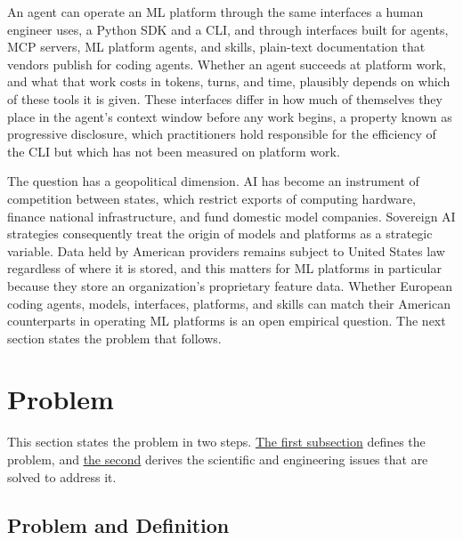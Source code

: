 \documentclass[
english,                 %
bibtex,                  %
]{kththesis}
\numberwithin{listing}{chapter}
\begin{document}
An agent can operate an \gls{ML} platform through the same interfaces a human engineer uses, a Python \gls{SDK} and a \gls{CLI}, and through interfaces built for agents, \gls{MCP} servers, \gls{ML} platform agents, and skills, plain-text documentation that vendors publish for coding agents. Whether an agent succeeds at platform work, and what that work costs in tokens, turns, and time, plausibly depends on which of these tools it is given. These interfaces differ in how much of themselves they place in the agent's context window before any work begins, a property known as progressive disclosure, which practitioners hold responsible for the efficiency of the \gls{CLI} but which has not been measured on platform work.

The question has a geopolitical dimension. \Gls{AI} has become an instrument of competition between states, which restrict exports of computing hardware, finance national infrastructure, and fund domestic model companies. Sovereign \gls{AI} strategies consequently treat the origin of models and platforms as a strategic variable. Data held by American providers remains subject to United States law regardless of where it is stored, and this matters for \gls{ML} platforms in particular because they store an organization's proprietary feature data. Whether European coding agents, models, interfaces, platforms, and skills can match their American counterparts in operating \gls{ML} platforms is an open empirical question. The next section states the problem that follows.

\section{Problem}
\label{sec:intro_problem}
\glsresetall

This section states the problem in two steps. \hyperref[sec:intro_problem_and_definition]{The first subsection} defines the problem, and \hyperref[sec:intro_scientific_and_engineering_issues]{the second} derives the scientific and engineering issues that are solved to address it.

\subsection{Problem and Definition}
\label{sec:intro_problem_and_definition}
\glsresetall
\end{document}
